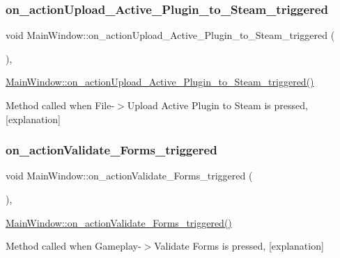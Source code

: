\subsubsection{\texorpdfstring{on\+\_\+action\+Upload\+\_\+\+Active\+\_\+\+Plugin\+\_\+to\+\_\+\+Steam\+\_\+triggered}{on\_actionUpload\_Active\_Plugin\_to\_Steam\_triggered}}
{\footnotesize\ttfamily void Main\+Window\+::on\+\_\+action\+Upload\+\_\+\+Active\+\_\+\+Plugin\+\_\+to\+\_\+\+Steam\+\_\+triggered (\begin{DoxyParamCaption}{ }\end{DoxyParamCaption})\hspace{0.3cm}{\ttfamily [private]}, {\ttfamily [slot]}}



\hyperlink{class_main_window_a3e35b065b22cbe720c98787325b348c9}{Main\+Window\+::on\+\_\+action\+Upload\+\_\+\+Active\+\_\+\+Plugin\+\_\+to\+\_\+\+Steam\+\_\+triggered()} 

Method called when File-\/$>$Upload Active Plugin to Steam is pressed, \mbox{[}explanation\mbox{]} \mbox{\label{class_main_window_a02d0301ee80141c512d471c3af894f0d}} 
\subsubsection{\texorpdfstring{on\+\_\+action\+Validate\+\_\+\+Forms\+\_\+triggered}{on\_actionValidate\_Forms\_triggered}}
{\footnotesize\ttfamily void Main\+Window\+::on\+\_\+action\+Validate\+\_\+\+Forms\+\_\+triggered (\begin{DoxyParamCaption}{ }\end{DoxyParamCaption})\hspace{0.3cm}{\ttfamily [private]}, {\ttfamily [slot]}}



\hyperlink{class_main_window_a02d0301ee80141c512d471c3af894f0d}{Main\+Window\+::on\+\_\+action\+Validate\+\_\+\+Forms\+\_\+triggered()} 

Method called when Gameplay-\/$>$Validate Forms is pressed, \mbox{[}explanation\mbox{]} \mbox{\label{class_main_window_ab1627fe6865e74d1e6364a0183abdf5c}} 
